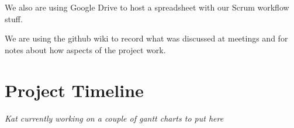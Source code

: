 \documentclass[11pt, oneside]{article}
\begin{document}
We also are using Google Drive to host a spreadsheet with our Scrum
workflow stuff.

We are using the github wiki to record what was discussed at meetings
and for notes about how aspects of the project work.


\section*{Project Timeline}

{\em Kat currently working on a couple of gantt charts to put here}

\end{document}
